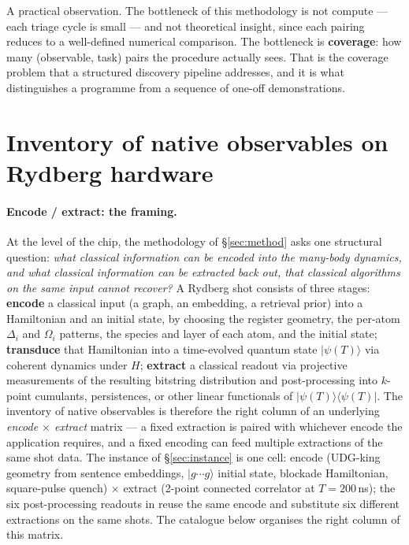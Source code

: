 \documentclass[10pt]{article}
\begin{document}
A practical observation. The bottleneck of this methodology is not compute --- each triage cycle is small --- and not theoretical insight, since each pairing reduces to a well-defined numerical comparison. The bottleneck is \textbf{coverage}: how many (observable, task) pairs the procedure actually sees. That is the coverage problem that a structured discovery pipeline addresses, and it is what distinguishes a programme from a sequence of one-off demonstrations.

\section{Inventory of native observables on Rydberg hardware}\label{sec:inventory}

\paragraph{Encode / extract: the framing.}
At the level of the chip, the methodology of \S\ref{sec:method} asks one structural question: \emph{what classical information can be encoded into the many-body dynamics, and what classical information can be extracted back out, that classical algorithms on the same input cannot recover?} A Rydberg shot consists of three stages: \textbf{encode} a classical input (a graph, an embedding, a retrieval prior) into a Hamiltonian and an initial state, by choosing the register geometry, the per-atom $\Delta_i$ and $\Omega_i$ patterns, the species and layer of each atom, and the initial state; \textbf{transduce} that Hamiltonian into a time-evolved quantum state $|\psi(T)\rangle$ via coherent dynamics under $H$; \textbf{extract} a classical readout via projective measurements of the resulting bitstring distribution and post-processing into $k$-point cumulants, persistences, or other linear functionals of $|\psi(T)\rangle\langle\psi(T)|$. The inventory of native observables is therefore the right column of an underlying \emph{encode $\times$ extract} matrix --- a fixed extraction is paired with whichever encode the application requires, and a fixed encoding can feed multiple extractions of the same shot data. The instance of \S\ref{sec:instance} is one cell: encode (UDG-king geometry from sentence embeddings, $|g{\cdots}g\rangle$ initial state, blockade Hamiltonian, square-pulse quench) $\times$ extract (2-point connected correlator at $T = 200\,$ns); the six post-processing readouts in \cite{jurczak2026atomrank} reuse the same encode and substitute six different extractions on the same shots. The catalogue below organises the right column of this matrix.
\end{document}
